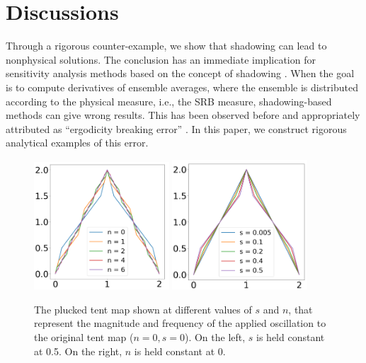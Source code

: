 \section{Discussions}
Through a rigorous counter-example, we show that shadowing can lead
to nonphysical solutions.  The conclusion has an immediate implication for
sensitivity analysis methods based on the concept of shadowing \cite{qiqi-lss}\cite{angxiu-lss}\cite{lasagna}.
When the goal is to compute derivatives of ensemble averages, where the ensemble
is distributed according to the physical measure, i.e., the SRB measure, shadowing-based methods can give wrong results.  This has been observed
before and appropriately attributed as ``ergodicity breaking error'' \cite{patrick} \cite{angxiu-error}. In this paper, we construct rigorous analytical examples of this error.
\begin{figure}
    \centering
    \includegraphics[width=0.45\textwidth]{figure/osc_tent_n.png}
    \includegraphics[width=0.45\textwidth]{figure/osc_tent_s.png}
    \caption{The plucked tent map shown at different values of $s$ and $n$, that represent the magnitude and frequency of the applied oscillation to the original tent map ($n=0,s=0$). On the left, $s$ is held constant at 0.5. On the right, $n$ is held constant at 0.}
    \label{fig:osc_map}
\end{figure}
